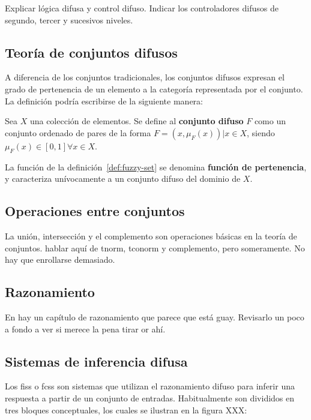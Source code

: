 Explicar lógica difusa y control difuso. Indicar los controladores difusos de segundo, tercer y sucesivos niveles.

\subsection{Teoría de conjuntos difusos}

A diferencia de los conjuntos tradicionales, los conjuntos difusos expresan el grado de pertenencia de un elemento a la categoría representada por el conjunto. La definición podría escribirse de la siguiente manera:


\begin{definition}
	Sea $X$ una colección de elementos. Se define al \textbf{conjunto difuso} $F$ como un conjunto ordenado de pares de la forma $F = {(x, \mu_F(x)) | x \in X}$, siendo $\mu_F(x) \in [0, 1] \forall x \in X$.
	\label{def:fuzzy-set}
\end{definition}

La función de la definición~\ref{def:fuzzy-set} se denomina \textbf{función de pertenencia}, y caracteriza unívocamente a un conjunto difuso del dominio de $X$.


\subsection{Operaciones entre conjuntos}

La unión, intersección y el complemento son operaciones básicas en la teoría de conjuntos. \TODO hablar aquí de tnorm, tconorm y complemento, pero someramente. No hay que enrollarse demasiado.

\subsection{Razonamiento}

En \cite{Ma} hay un capítulo de razonamiento que parece que está guay. Revisarlo un poco a fondo a ver si merece la pena tirar or ahí.

\subsection{Sistemas de inferencia difusa}

Los \acp{fis} o \acp{fcs} son sistemas que utilizan el razonamiento difuso para inferir una respuesta a partir de un conjunto de entradas. Habitualmente son divididos en tres bloques conceptuales, los cuales se ilustran en la figura XXX:

